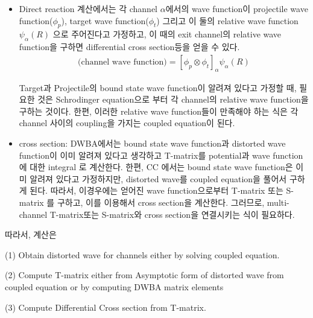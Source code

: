 \documentclass[11pt]{book}
\newcommand{\bea}{\begin{eqnarray}}
\newcommand{\eea}{\end{eqnarray}}
\begin{document}
\begin{itemize} 
\item Direct reaction 계산에서는 각 channel $\alpha$에서의 wave function이 
projectile wave function($\phi_p$), target wave function($\phi_t$) 
그리고 이 둘의 relative wave function $\psi_\alpha(R)$
으로 주어진다고 가정하고, 이 때의 exit channel의 relative wave function을 구하면 
differential cross section등을 얻을 수 있다. 
\bea 
\mbox{(channel wave function)}= [\phi_p\otimes \phi_t]_\alpha \psi_\alpha(R)
\eea  

Target과 Projectile의 bound state wave function이 
알려져 있다고 가정할 때, 필요한 것은 Schrodinger equation으로 부터 
각 channel의 relative wave function을 구하는 것이다. 
한편, 이러한 relative wave function들이 만족해야 하는 식은 
각 channel 사이의 coupling을 가지는 coupled equation이 된다. 

\item cross section: DWBA에서는 bound state wave function과 distorted wave function이 
      이미 알려져 있다고 생각하고 T-matrix를 potential과 wave function에 대한 integral 로 계산한다. 한편, CC 에서는 bound state wave function은 이미 알려져 있다고 가정하지만,
      distorted wave를  coupled equation을 풀어서 구하게 된다. 따라서, 이경우에는 
      얻어진 wave function으로부터 T-matrix 또는 S-matrix 를 구하고, 이를 이용해서
      cross section을 계산한다. 그러므로, multi-channel T-matrix또는 S-matrix와 
      cross section을 연결시키는 식이 필요하다.       
\end{itemize}

따라서, 계산은 

(1) Obtain distorted wave for channels either by solving coupled equation.

(2) Compute T-matrix either from Asymptotic form of 
    distorted wave from coupled equation or by computing DWBA matrix elements
    
(3) Compute Differential Cross section from T-matrix.     
\end{document}
